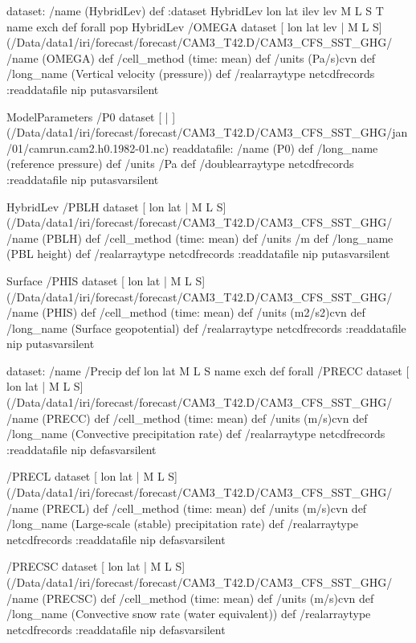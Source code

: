 \begin{ingrid}
dataset: /name (HybridLev) def :dataset
HybridLev { lon lat ilev lev M L S T} {name exch def} forall pop
HybridLev /OMEGA{
dataset
[ lon lat lev | M L S] (/Data/data1/iri/forecast/forecast/CAM3_T42.D/CAM3_CFS_SST_GHG/%
/name (OMEGA) def
 /cell_method (time: mean) def
 /units (Pa/s)cvn def
 /long_name (Vertical velocity (pressure)) def
 /realarraytype netcdfrecords :readdatafile
nip
}putasvarsilent

ModelParameters /P0{
dataset
[ | ] (/Data/data1/iri/forecast/forecast/CAM3_T42.D/CAM3_CFS_SST_GHG/jan/01/camrun.cam2.h0.1982-01.nc) readdatafile:
/name (P0) def
 /long_name (reference pressure) def
 /units /Pa def
 /doublearraytype netcdfrecords :readdatafile
nip
}putasvarsilent


HybridLev  /PBLH{
dataset
[ lon lat | M L S] (/Data/data1/iri/forecast/forecast/CAM3_T42.D/CAM3_CFS_SST_GHG/%
/name (PBLH) def
 /cell_method (time: mean) def
 /units /m def
 /long_name (PBL height) def
 /realarraytype netcdfrecords :readdatafile
nip
}putasvarsilent

Surface /PHIS{
dataset
[ lon lat | M L S] (/Data/data1/iri/forecast/forecast/CAM3_T42.D/CAM3_CFS_SST_GHG/%
/name (PHIS) def
 /cell_method (time: mean) def
 /units (m2/s2)cvn def
 /long_name (Surface geopotential) def
 /realarraytype netcdfrecords :readdatafile
nip
}putasvarsilent

dataset: /name /Precip def
 { lon lat  M L S } {name exch def} forall
 /PRECC{
dataset
[ lon lat | M L S] (/Data/data1/iri/forecast/forecast/CAM3_T42.D/CAM3_CFS_SST_GHG/%
/name (PRECC) def
 /cell_method (time: mean) def
 /units (m/s)cvn def
 /long_name (Convective precipitation rate) def
 /realarraytype netcdfrecords :readdatafile
nip
}defasvarsilent

 /PRECL{
dataset
[ lon lat | M L S] (/Data/data1/iri/forecast/forecast/CAM3_T42.D/CAM3_CFS_SST_GHG/%
/name (PRECL) def
 /cell_method (time: mean) def
 /units (m/s)cvn def
 /long_name (Large-scale (stable) precipitation rate) def
 /realarraytype netcdfrecords :readdatafile
nip
}defasvarsilent

/PRECSC{
dataset
[ lon lat | M L S] (/Data/data1/iri/forecast/forecast/CAM3_T42.D/CAM3_CFS_SST_GHG/%
/name (PRECSC) def
 /cell_method (time: mean) def
 /units (m/s)cvn def
 /long_name (Convective snow rate (water equivalent)) def
 /realarraytype netcdfrecords :readdatafile
nip
}defasvarsilent


\end{ingrid}
